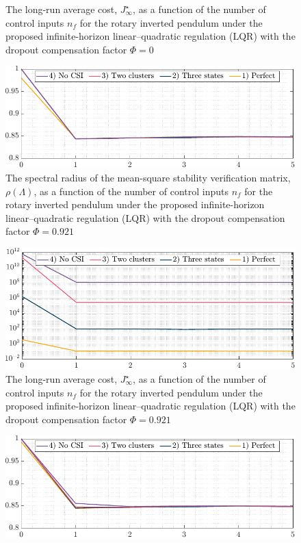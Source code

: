 {\begin{figure}[h!]
\begin{center}
\caption{The long-run average cost, $J_{\infty}^{\star}$, as a function of the number of control inputs $n_f$ for the rotary inverted pendulum under the proposed infinite-horizon linear–quadratic regulation (LQR) with the dropout compensation factor $\mathit{\Phi}=0$}\label{fig:cost-cntrl-0}
\end{center}
\end{figure}
\begin{figure}[h!]
\begin{center}
\includegraphics[width=0.76\columnwidth]{stability-cntrl-9.pdf}
\caption{The spectral radius of the mean-square stability verification matrix, $\rho(\mathit{\Lambda})$, as a function of the number of control inputs $n_f$ for the rotary inverted pendulum under the proposed infinite-horizon linear–quadratic regulation (LQR) with the dropout compensation factor $\mathit{\Phi}=0.921$}\label{fig:stability-coeff-9}
\end{center}
\end{figure}
\begin{figure}[h!]
\begin{center}
\includegraphics[width=0.76\columnwidth]{cost-cntrl-9.pdf}
\caption{The long-run average cost, $J_{\infty}^{\star}$, as a function of the number of control inputs $n_f$ for the rotary inverted pendulum under the proposed infinite-horizon linear–quadratic regulation (LQR) with the dropout compensation factor $\mathit{\Phi}=0.921$}\label{fig:cost-cntrl-9}
\end{center}
\end{figure}
\newpage
\begin{figure}[h!]
\begin{center}
\includegraphics[width=0.76\columnwidth]{stability-cntrl-1.pdf}

\end{center}
\end{figure}}
